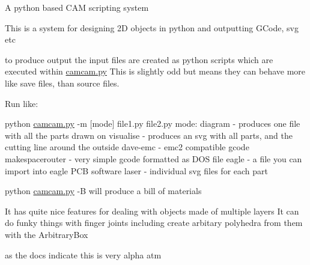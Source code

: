 A python based C\+A\+M scripting system

This is a system for designing 2\+D objects in python and outputting G\+Code, svg etc

to produce output the input files are created as python scripts which are executed within \hyperlink{camcam_8py}{camcam.\+py} This is slightly odd but means they can behave more like save files, than source files.

Run like\+:

python \hyperlink{camcam_8py}{camcam.\+py} -\/m \mbox{[}mode\mbox{]} file1.\+py file2.\+py mode\+: diagram -\/ produces one file with all the parts drawn on visualise -\/ produces an svg with all parts, and the cutting line around the outside dave-\/emc -\/ emc2 compatible gcode makespacerouter -\/ very simple gcode formatted as D\+O\+S file eagle -\/ a file you can import into eagle P\+C\+B software laser -\/ individual svg files for each part

python \hyperlink{camcam_8py}{camcam.\+py} -\/\+B will produce a bill of materials

It has quite nice features for dealing with objects made of multiple layers It can do funky things with finger joints including create arbitary polyhedra from them with the Arbitrary\+Box

as the docs indicate this is very alpha atm 